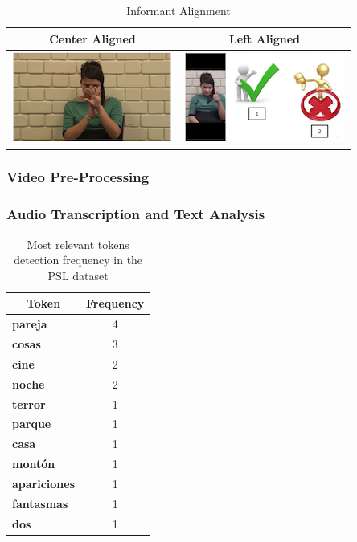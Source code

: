 \documentclass[twocolumn,conference]{article}
\begin{document}
\begin{table}[!htb]
\captionsetup{font=footnotesize}
\centering
\begin{tabular}{cc}
\toprule
\multicolumn{1}{c}{\textbf{Center Aligned}} & 
	\multicolumn{1}{c}{\textbf{Left Aligned}}\\
\midrule
\includegraphics{images/informant-center-alignment.png}& \includegraphics{images/informant-left-alignment.png}\\
\bottomrule
\end{tabular}
\caption{Informant Alignment} \label{table:informant-alignment}
\end{table}

\subsubsection{Video Pre-Processing}\label{video-pre-processing}
\subsubsection{Audio Transcription and Text Analysis}\label{audio-transcription-analysis}
\begin{table}[!htb]
\captionsetup{size=footnotesize}
\begin{tabular}{ p{16em} c}
\toprule
\multicolumn{1}{c}{\textbf{Token}} & 
	\multicolumn{1}{c}{\textbf{Frequency}}\\
\midrule
\textbf{pareja}&	4\\
\textbf{cosas}&	3\\
\textbf{cine}&	2\\
\textbf{noche}&	2\\
\textbf{terror}&	1\\
\textbf{parque}&	1\\
\textbf{casa}&	1\\
\textbf{montón}&	1\\
\textbf{apariciones}&	1\\
\textbf{fantasmas}&	1\\
\textbf{dos}&	1\\
\bottomrule
\end{tabular}
\caption{Most relevant tokens detection frequency in the PSL dataset} \label{tab:token-freq}
\end{table}
\end{document}
